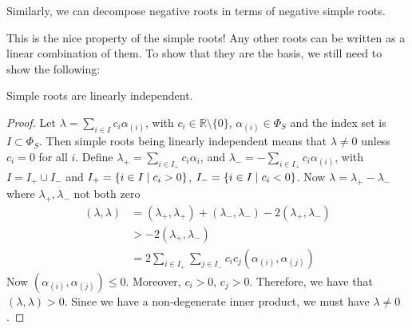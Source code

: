 \begin{remark}
  Similarly, we can decompose negative roots in terms of negative simple roots.
\end{remark}
This is the nice property of the simple roots! Any other roots can be written as a linear combination of them.
To show that they are the basis, we still need to show the following:
\begin{claim}
  \label{cl:19-5}
  Simple roots are linearly independent.
\end{claim}
\begin{proof}
  Let $\lambda = \sum_{i \in I} c_{i} \alpha_{(i)}$, with $c_{i} \in \mathbb{R}\setminus{\{0\}}$, $\alpha_{(i)} \in \Phi_S$ and the index set is $I \subset \Phi_S$.
  Then simple roots being linearly independent means that $\lambda \neq 0$ unless $c_{i} = 0$ for all $i$.
  Define $\lambda_+ = \sum_{i\in I_+} c_{i} \alpha_{i}$, and $\lambda_- = -\sum_{i \in I_+} c_{i} \alpha_{(i)}$, with $I = I_+ \cup I_-$ and $I_+ = \left\{ i \in I \suchthat c_{i} > 0 \right\}$, $I_- = \left\{ i \in I \suchthat c_i < 0 \right\}$.
  Now $\lambda = \lambda_+ - \lambda_-$ where $\lambda_+, \lambda_-$ not both zero
  \begin{align}
    (\lambda, \lambda) &= (\lambda_+, \lambda_+) + (\lambda_-, \lambda_-) - 2(\lambda_+, \lambda_-) \\
		       &> -2 (\lambda_+, \lambda_-) \\
		       &= 2 \sum_{i\in I_+} \sum_{j \in I_-} c_{i} c_{j} (\alpha_{(i)}, \alpha_{(j)})
  \end{align}
  Now $(\alpha_{(i)}, \alpha_{(j)}) \leq 0$. Moreover, $c_{i} > 0$, $c_{j} > 0$. Therefore, we have that $(\lambda, \lambda) > 0$. Since we have a non-degenerate inner product, we must have $\lambda \neq 0$.
\end{proof}

